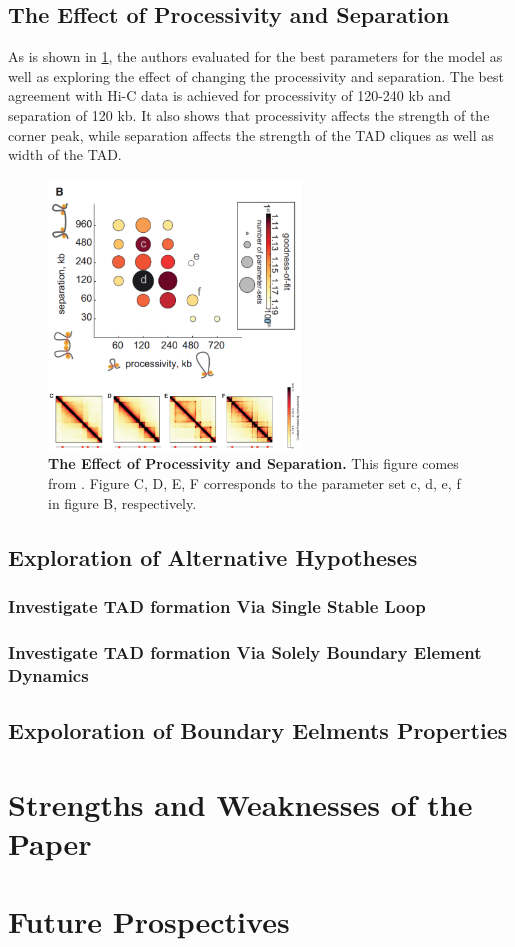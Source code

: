 \documentclass[11pt]{article}
\begin{document}
\subsection{The Effect of Processivity and Separation}

As is shown in \cref{fig:processivity and separation}, the authors evaluated for the best parameters for the model as well as exploring the effect of changing the processivity and separation. The best agreement with Hi-C data is achieved for processivity of 120-240 kb and separation of 120 kb. It also shows that processivity affects the strength of the corner peak, while separation affects the strength of the TAD cliques as well as width of the TAD.

\begin{figure}[htbp]
  \centering
  \includegraphics[width=0.6\textwidth]{assets/Snipaste_2023-01-13_18-19-27.png}
  \caption{\textbf{The Effect of Processivity and Separation.} This figure comes from \cite{fudenberg_formation_2016}. Figure C, D, E, F corresponds to the parameter set c, d, e, f in figure B, respectively.}
  \label{fig:processivity and separation}
\end{figure}

\subsection{Exploration of Alternative Hypotheses}

\subsubsection*{Investigate TAD formation Via Single Stable Loop}

\subsubsection*{Investigate TAD formation Via Solely Boundary Element Dynamics}


\subsection{Expoloration of Boundary Eelments Properties}

\section{Strengths and Weaknesses of the Paper}

\section{Future Prospectives}

\printbibliography
\end{document}
